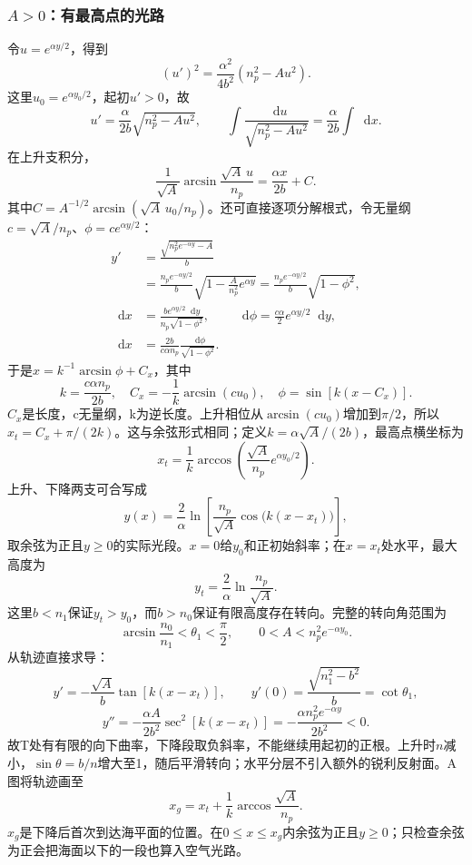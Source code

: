 \documentclass[UTF8,fontset=fandol,a4paper,11pt]{ctexart}
\newcommand{\dd}{\mathop{}\!\mathrm{d}}
\begin{document}
\subsubsection*{$A>0$：有最高点的光路}
令$u=e^{\alpha y/2}$，得到
\[
(u')^2=\frac{\alpha^2}{4b^2}(n_p^2-Au^2).
\]
这里$u_0=e^{\alpha y_0/2}$，起初$u'>0$，故
\[
u'=\frac{\alpha}{2b}\sqrt{n_p^2-Au^2},\qquad
\int\frac{\dd u}{\sqrt{n_p^2-Au^2}}
=\frac{\alpha}{2b}\int\dd x.
\]
在上升支积分，
\[
\frac1{\sqrt A}\arcsin\frac{\sqrt A\,u}{n_p}
=\frac{\alpha x}{2b}+C.
\]
其中$C=A^{-1/2}\arcsin(\sqrt A\,u_0/n_p)$。还可直接逐项分解根式，令无量纲$c=\sqrt A/n_p$、$\phi=c e^{\alpha y/2}$：
\[
\begin{aligned}
y'&=\frac{\sqrt{n_p^2e^{-\alpha y}-A}}b\\
&=\frac{n_p e^{-\alpha y/2}}b
  \sqrt{1-\frac A{n_p^2}e^{\alpha y}}
=\frac{n_p e^{-\alpha y/2}}b\sqrt{1-\phi^2},\\
\dd x&=\frac{b e^{\alpha y/2}\dd y}{n_p\sqrt{1-\phi^2}},
\qquad
\dd\phi=\frac{c\alpha}{2}e^{\alpha y/2}\dd y,\\
\dd x&=\frac{2b}{c\alpha n_p}
 \frac{\dd\phi}{\sqrt{1-\phi^2}}.
\end{aligned}
\]
于是$x=k^{-1}\arcsin\phi+C_x$，其中
\[
k=\frac{c\alpha n_p}{2b},\quad
C_x=-\frac1k\arcsin(cu_0),\quad
\phi=\sin[k(x-C_x)].
\]
$C_x$是长度，c无量纲，k为逆长度。上升相位从$\arcsin(cu_0)$增加到$\pi/2$，所以$x_t=C_x+\pi/(2k)$。这与余弦形式相同；定义$k=\alpha\sqrt A/(2b)$，最高点横坐标为
\[
x_t=\frac1k\arccos\left(\frac{\sqrt A}{n_p}
e^{\alpha y_0/2}\right).
\]
上升、下降两支可合写成
\[
\boxed{y(x)=\frac2\alpha
\ln\!\left[\frac{n_p}{\sqrt A}
\cos\bigl(k(x-x_t)\bigr)\right]},
\]
取余弦为正且$y\ge0$的实际光段。$x=0$给$y_0$和正初始斜率；在$x=x_t$处水平，最大高度为
\[
\boxed{y_t=\frac2\alpha\ln\frac{n_p}{\sqrt A}}.
\]
这里$b<n_1$保证$y_t>y_0$，而$b>n_0$保证有限高度存在转向。完整的转向角范围为
\[
\arcsin\frac{n_0}{n_1}<\theta_1<\frac\pi2,\qquad
0<A<n_p^2e^{-\alpha y_0}.
\]
从轨迹直接求导：
\[
y'=-\frac{\sqrt A}{b}\tan[k(x-x_t)],\qquad
y'(0)=\frac{\sqrt{n_1^2-b^2}}b=\cot\theta_1,
\]
\[
y''=-\frac{\alpha A}{2b^2}\sec^2[k(x-x_t)]
=-\frac{\alpha n_p^2e^{-\alpha y}}{2b^2}<0.
\]
故T处有有限的向下曲率，下降段取负斜率，不能继续用起初的正根。上升时$n$减小，$\sin\theta=b/n$增大至1，随后平滑转向；水平分层不引入额外的锐利反射面。A图将轨迹画至
\[
x_g=x_t+\frac1k\arccos\frac{\sqrt A}{n_p}.
\]
$x_g$是下降后首次到达海平面的位置。在$0\le x\le x_g$内余弦为正且$y\ge0$；只检查余弦为正会把海面以下的一段也算入空气光路。
\end{document}
